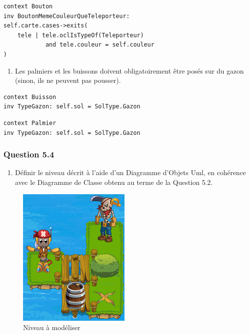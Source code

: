 \documentclass[]{article}
\providecommand{\tightlist}{%
  \setlength{\itemsep}{0pt}\setlength{\parskip}{0pt}}
\begin{document}
\begin{verbatim}
context Bouton
inv BoutonMemeCouleurQueTeleporteur:
self.carte.cases->exits(
	tele | tele.oclIsTypeOf(Teleporteur)
			and tele.couleur = self.couleur
)
\end{verbatim}

\begin{enumerate}
\def\labelenumi{\arabic{enumi})}
\setcounter{enumi}{7}
\tightlist
\item
  Les palmiers et les buissons doivent obligatoirement être posés sur du
  gazon (sinon, ils ne peuvent pas pousser).
\end{enumerate}

\begin{verbatim}
context Buisson
inv TypeGazon: self.sol = SolType.Gazon
\end{verbatim}

\begin{verbatim}
context Palmier
inv TypeGazon: self.sol = SolType.Gazon
\end{verbatim}

\hypertarget{question-5.4}{%
\subsubsection{Question 5.4}\label{question-5.4}}

\begin{enumerate}
\def\labelenumi{\arabic{enumi})}
\tightlist
\item Définir le niveau décrit à l'aide d'un Diagramme d'Objets Uml, en cohérence avec le Diagramme de Classe obtenu au terme de la Question 5.2.
\end{enumerate}

\begin{figure}
\centering
\includegraphics{./images_final/Niveau1.png}
\caption{Niveau à modéliser}
\end{figure}
\end{document}
